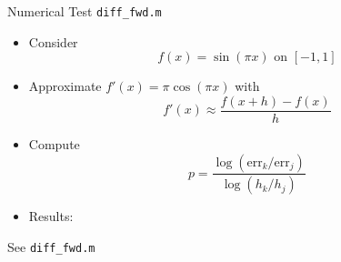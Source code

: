 \documentclass[10pt]{beamer}
\begin{document}
\begin{frame}{Numerical Test  \texttt{diff\_fwd.m} }
\vspace{-5pt}

\begin{itemize}
    \item Consider
    \begin{equation*}
      f(x) = \sin(\pi x)\,\, \text{on}\,\, [-1,1]
    \end{equation*}
    \item Approximate $f'(x) = \pi \cos(\pi x)$ with
    \begin{equation*}
      f'(x) \approx \frac{f(x+h)-f(x)}{h}
    \end{equation*}
    \item Compute
    \begin{equation*}
      p = \frac{ \log(\text{err}_k/\text{err}_j) }{ \log(h_k/h_j) }
    \end{equation*}

    \item Results: 
\end{itemize}
    \vspace{3mm}

    \begin{center}
        See \texttt{diff\_fwd.m}
    \end{center}
\end{frame}
\end{document}
